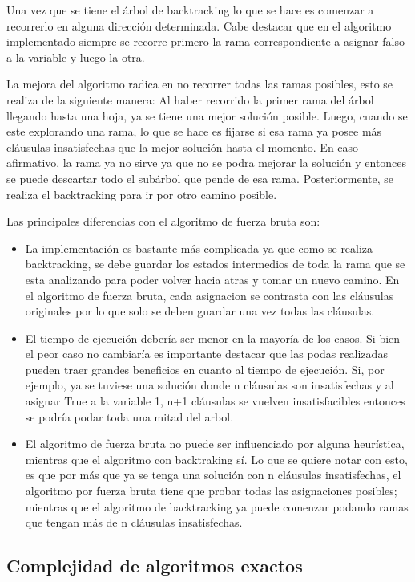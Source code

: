 \documentclass[a4paper,10pt]{article}
\begin{document}
Una vez que se tiene el \'arbol de backtracking lo que se hace es comenzar a recorrerlo en alguna direcci\'on determinada. Cabe destacar que en el algoritmo implementado siempre se recorre primero la rama correspondiente a asignar falso a la variable y luego la otra.

La mejora del algoritmo radica en no recorrer todas las ramas posibles, esto se realiza de la siguiente manera: Al haber recorrido la primer rama del \'arbol llegando hasta una hoja, ya se tiene una mejor soluci\'on posible. Luego, cuando se este explorando una rama, lo que se hace es fijarse si esa rama ya posee m\'as cl\'ausulas insatisfechas que la mejor soluci\'on hasta el momento. En caso afirmativo, la rama ya no sirve ya que no se podra mejorar la soluci\'on y entonces se puede descartar todo el sub\'arbol que pende de esa rama. Posteriormente, se realiza el backtracking para ir por otro camino posible. 

Las principales diferencias con el algoritmo de fuerza bruta son:
\begin{itemize}
\item La implementaci\'on es bastante m\'as complicada ya que como se realiza backtracking, se debe guardar los estados intermedios de toda la rama que se esta analizando para poder volver hacia atras y tomar un nuevo camino. En el algoritmo de fuerza bruta, cada asignacion se contrasta con las cl\'ausulas originales por lo que solo se deben guardar una vez todas las cl\'ausulas.
\item El tiempo de ejecuci\'on deber\'ia ser menor en la mayor\'ia de los casos. Si bien el peor caso no cambiar\'ia es importante destacar que las podas realizadas pueden traer grandes beneficios en cuanto al tiempo de ejecuci\'on. Si, por ejemplo, ya se tuviese una soluci\'on donde n cl\'ausulas son insatisfechas y al asignar True a la variable 1, n+1 cl\'ausulas se vuelven insatisfacibles entonces se podr\'ia podar toda una mitad del arbol.
\item El algoritmo de fuerza bruta no puede ser influenciado por alguna heur\'istica, mientras que el algoritmo con backtraking s\'i. Lo que se quiere notar con esto, es que por m\'as que ya se tenga una soluci\'on con n cl\'ausulas insatisfechas, el algoritmo por fuerza bruta tiene que probar todas las asignaciones posibles; mientras que el algoritmo de backtracking ya puede comenzar podando ramas que tengan m\'as de n cl\'ausulas insatisfechas.
\end{itemize}


\subsection*{Complejidad de algoritmos exactos}
\end{document}

